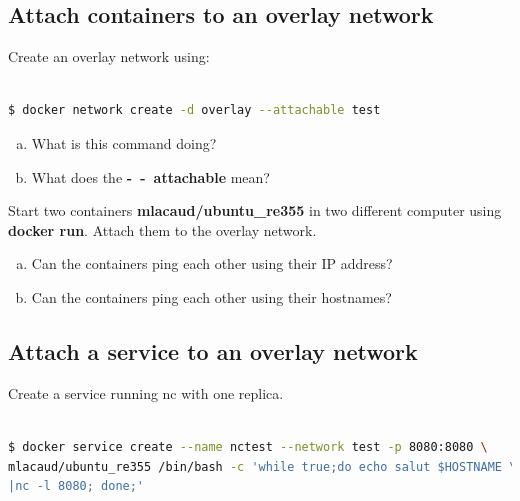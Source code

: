 \documentclass[a4paper,11pt]{exam}
\begin{document}
\subsection{Attach containers to an overlay network}
Create an overlay network using:

\begin{lstlisting}[frame=single,language={sh}]  % Start your code-block

$ docker network create -d overlay --attachable test 
\end{lstlisting}

\begin{questions}
	\question 
	\begin{enumerate}[(a)]
		\item What is this command doing?
		\item What does the \textbf{-~-~attachable} mean?
	\end{enumerate}


Start two containers \textbf{mlacaud/ubuntu\_re355} in two different computer using \textbf{docker run}. Attach them to the overlay network.


	\question 
	\begin{enumerate}[(a)]
		\item Can the containers ping each other using their IP address?
		\item Can the containers ping each other using their hostnames?
	\end{enumerate}
\end{questions}

\subsection{Attach a service to an overlay network}

Create a service running nc with one replica.

\begin{lstlisting}[frame=single,language={sh}]  % Start your code-block

$ docker service create --name nctest --network test -p 8080:8080 \
mlacaud/ubuntu_re355 /bin/bash -c 'while true;do echo salut $HOSTNAME \
|nc -l 8080; done;'
\end{lstlisting}
\end{document}

